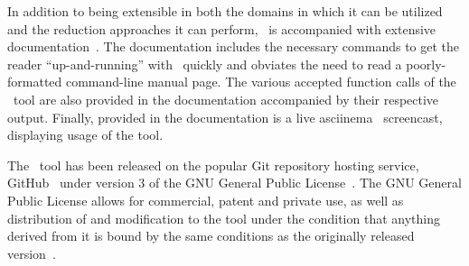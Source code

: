 In addition to being extensible in both the domains in which it can be utilized and the
reduction approaches it can perform, \mr~is accompanied with extensive documentation~\cite{tool}.
The documentation includes the necessary commands to get the reader ``up-and-running''
with \mr~quickly and obviates the need to read a poorly-formatted command-line manual page.
The various accepted function calls of the \mr~tool are also provided in the documentation
accompanied by their respective output. Finally, provided in the documentation is a live
asciinema~\cite{asciinema} screencast, displaying usage of the tool.

The \mr~tool has been released on the popular Git repository hosting service, GitHub~\cite{github}
under version 3 of the GNU General Public License~\cite{license}. The GNU General Public License
allows for commercial, patent and private use, as well as distribution of and modification to the tool
under the condition that anything derived from it is bound by the same conditions as the originally
released version~\cite{copyleft}.

% 
% 
% 
